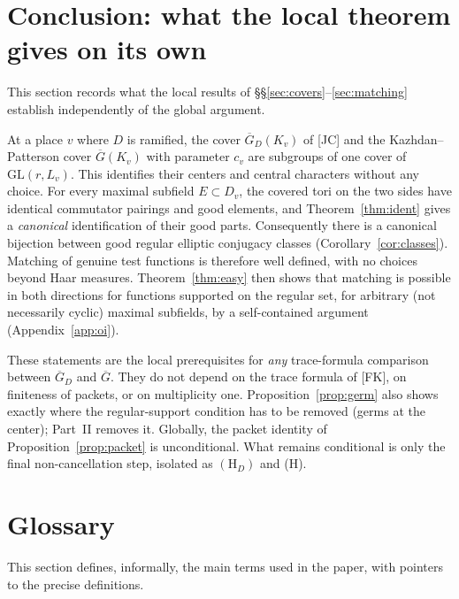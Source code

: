 \documentclass[12pt]{article}
\newcommand{\ov}[1]{\overline{#1}}
\newcommand{\GL}{\mathrm{GL}}
\newcommand{\Gb}{\ov{G}}
\newcommand{\GDb}{\ov{G}_D}
\theoremstyle{plain}
\theoremstyle{definition}
\begin{document}
\section{Conclusion: what the local theorem gives on its own}\label{sec:conclusion}
This section records what the local results of \S\S\ref{sec:covers}--\ref{sec:matching} establish independently of the global argument.

At a place $v$ where $D$ is ramified, the cover $\GDb(K_v)$ of [JC] and the Kazhdan--Patterson cover $\Gb(K_v)$ with parameter $c_v$ are subgroups of one cover of $\GL(r,L_v)$. This identifies their centers and central characters without any choice. For every maximal subfield $E\subset D_v$, the covered tori on the two sides have identical commutator pairings and good elements, and Theorem~\ref{thm:ident} gives a \emph{canonical} identification of their good parts. Consequently there is a canonical bijection between good regular elliptic conjugacy classes (Corollary~\ref{cor:classes}). Matching of genuine test functions is therefore well defined, with no choices beyond Haar measures. Theorem~\ref{thm:easy} then shows that matching is possible in both directions for functions supported on the regular set, for arbitrary (not necessarily cyclic) maximal subfields, by a self-contained argument (Appendix~\ref{app:oi}).

These statements are the local prerequisites for \emph{any} trace-formula comparison between $\GDb$ and $\Gb$. They do not depend on the trace formula of [FK], on finiteness of packets, or on multiplicity one. Proposition~\ref{prop:germ} also shows exactly where the regular-support condition has to be removed (germs at the center); Part~II removes it. Globally, the packet identity of Proposition~\ref{prop:packet} is unconditional. What remains conditional is only the final non-cancellation step, isolated as $(\mathrm H_D)$ and (H).

\section{Glossary}\label{sec:glossary}
This section defines, informally, the main terms used in the paper, with pointers to the precise definitions.
\end{document}

